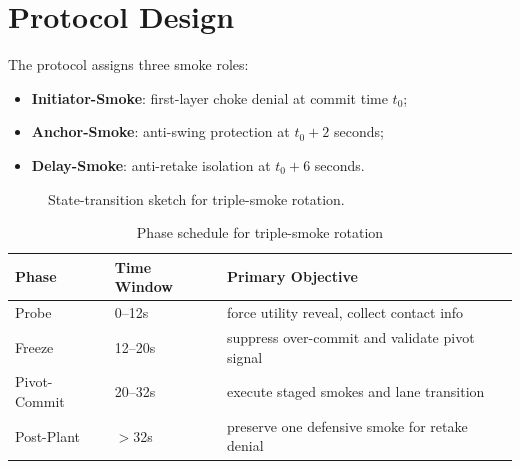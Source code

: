 \documentclass[runningheads]{llncs}
\begin{document}
\section{Protocol Design}
The protocol assigns three smoke roles:
\begin{itemize}
\item \textbf{Initiator-Smoke}: first-layer choke denial at commit time $t_0$;
\item \textbf{Anchor-Smoke}: anti-swing protection at $t_0 + 2$ seconds;
\item \textbf{Delay-Smoke}: anti-retake isolation at $t_0 + 6$ seconds.
\end{itemize}

\begin{figure}[t]
\centering
{}
\caption{State-transition sketch for triple-smoke rotation.}
\label{fig:state-flow-en}
\end{figure}

\begin{table}[t]
\centering
\caption{Phase schedule for triple-smoke rotation}
\begin{tabular}{lll}
\toprule
Phase & Time Window & Primary Objective \\
\midrule
Probe & 0--12s & force utility reveal, collect contact info \\
Freeze & 12--20s & suppress over-commit and validate pivot signal \\
Pivot-Commit & 20--32s & execute staged smokes and lane transition \\
Post-Plant & $>$32s & preserve one defensive smoke for retake denial \\
\bottomrule
\end{tabular}
\end{table}
\end{document}
